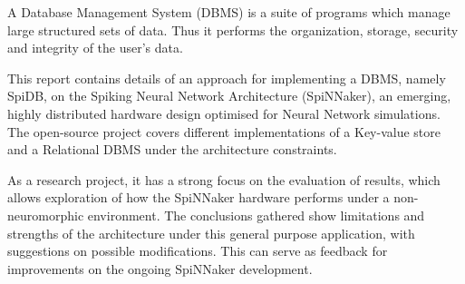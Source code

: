 { \par}
\vspace{5mm}
A Database Management System (DBMS) is a suite of programs which manage large structured sets of data.\cite{dbmsdef} Thus it performs the organization, storage, security and integrity of the user's data.

This report contains details of an approach for implementing a DBMS, namely SpiDB, on the Spiking Neural Network Architecture (SpiNNaker), an emerging, highly distributed hardware design optimised for Neural Network simulations. The open-source project covers different implementations of a Key-value store and a Relational DBMS under the architecture constraints.

As a research project, it has a strong focus on the evaluation of results, which allows exploration of how the SpiNNaker hardware performs under a non-neuromorphic environment. The conclusions gathered show limitations and strengths of the architecture under this general purpose application, with suggestions on possible modifications. This can serve as feedback for improvements on the ongoing SpiNNaker development.